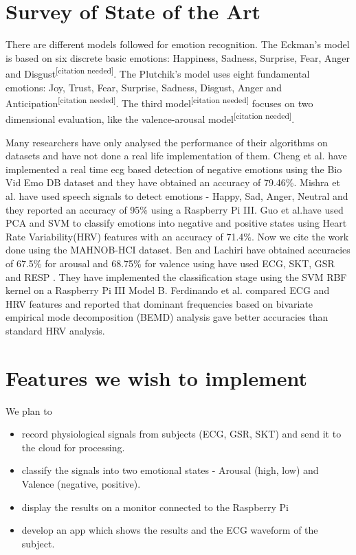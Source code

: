 \documentclass[11pt]{article}
\theoremstyle{definition}
\begin{document}
  \section{Survey of State of the Art}
    There are different models followed for emotion recognition. 
    The Eckman's model is based on six discrete basic emotions: Happiness, Sadness, Surprise, Fear, Anger and Disgust\textsuperscript{[citation needed]}. The Plutchik's model uses eight fundamental emotions: Joy, Trust, Fear, Surprise, Sadness, Disgust, Anger and Anticipation\textsuperscript{[citation needed]}. 
    The third model\textsuperscript{[citation needed]} focuses on two dimensional evaluation, like the valence-arousal model\textsuperscript{[citation needed]}.

    Many researchers have only analysed the performance of their algorithms on datasets and have not done a real life implementation of them.
    Cheng et al.\cite{cheng_novel_2017} have implemented a real time ecg based detection of negative emotions using the Bio Vid Emo DB dataset and they have obtained an accuracy of 79.46\%. 
    Mishra et al.\cite{mishra_real_2017} have used speech signals to detect emotions - Happy, Sad, Anger, Neutral and they reported an accuracy of 95\% using a Raspberry Pi III.
    Guo et al.\cite{guo_heart_2016}have used PCA and SVM to classify emotions into negative and positive states using Heart Rate Variability(HRV) features with an accuracy of 71.4\%.
    Now we cite the work done using the MAHNOB-HCI dataset\cite{soleymani_multimodal_2012}. 
    Ben and Lachiri\cite{ben_emotion_2017} have obtained accuracies of 67.5\% for arousal and 68.75\% for valence using have used ECG, SKT, GSR and RESP . They have implemented the classification stage using the SVM RBF kernel on a Raspberry Pi III Model B.
    Ferdinando et al.\cite{ferdinando_comparing_2016} compared ECG and HRV features and reported that dominant frequencies based on
    bivariate empirical mode decomposition (BEMD) analysis gave better accuracies than standard HRV analysis.
   
  \section{Features we wish to implement}
    We plan to 
    \begin{itemize}
      \item record physiological signals from subjects (ECG, GSR, SKT) and send it to the cloud for processing.
      \item classify the signals into two emotional states - Arousal (high, low) and Valence (negative, positive)\cite{ben_emotion_2017}.
      \item display the results on a monitor connected to the Raspberry Pi
      \item develop an app which shows the results and the ECG waveform of the subject.
    \end{itemize}
\end{document}
